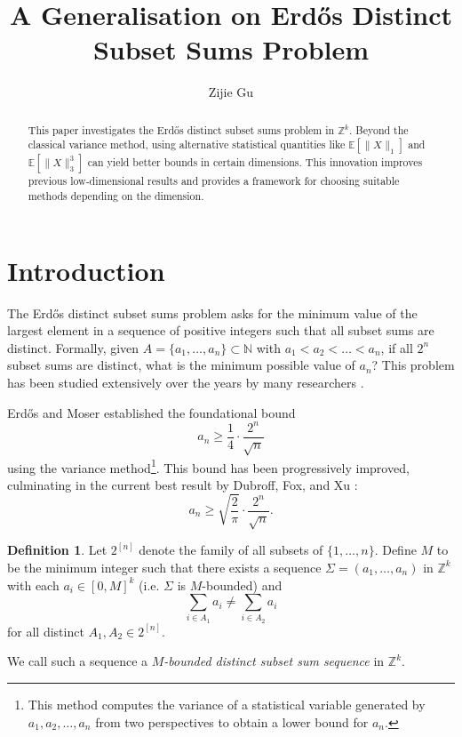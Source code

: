 \documentclass[11pt]{amsart}
\title{A Generalisation on Erd\H{o}s Distinct Subset Sums Problem}
\author{Zijie Gu}
\theoremstyle{plain}
\theoremstyle{definition}
\newtheorem{definition}[theorem]{Definition}
\numberwithin{equation}{section}
\begin{document}
\maketitle

\begin{abstract}
This paper investigates the Erd\H{o}s distinct subset sums problem in $\mathbb{Z}^k$. Beyond the classical variance method, using alternative statistical quantities like $\mathbb{E}[\|X\|_1]$ and $\mathbb{E}[\|X\|_3^3]$ can yield better bounds in certain dimensions. This innovation improves previous low-dimensional results and provides a framework for choosing suitable methods depending on the dimension. 
\end{abstract}

\section{Introduction}

The Erd\H{o}s distinct subset sums problem asks for the minimum value of the largest element in a sequence of positive integers such that all subset sums are distinct. Formally, given $A = \{a_1, \ldots, a_n\} \subset \mathbb{N}$ with $a_1 < a_2 < \ldots < a_n$, if all $2^n$ subset sums are distinct, what is the minimum possible value of $a_n$? This problem has been studied extensively over the years by many researchers \cite{aliev2008siegel, alon2016probabilistic, bae1996subset, elkies1986improved, erdos1941problems, guy1982sets,   steinerberger2023some,dubroff2021note}.



Erd\H{o}s and Moser \cite{erdos1941problems} established the foundational bound
\[
a_n \geq \frac{1}{4} \cdot \frac{2^n}{\sqrt{n}}
\]
using the variance method\footnote{This method computes the variance of a statistical variable generated by $a_1,a_2,\ldots,a_n$ from two perspectives to obtain a lower bound for $a_n$.}. This bound has been progressively improved, culminating in the current best result by Dubroff, Fox, and Xu \cite{dubroff2021note}:
\[
a_n \geq \sqrt{\frac{2}{\pi}} \cdot \frac{2^n}{\sqrt{n}}.
\]


\begin{definition}
    Let $2^{[n]}$ denote the family of all subsets of $\{1,\ldots,n\}$. Define $M$ to be the minimum integer such that there exists a sequence $\Sigma = (a_1,\ldots,a_n)$ in $\mathbb{Z}^k$ with each $a_i \in [0,M]^k$ (i.e. $\Sigma$ is $M$-bounded) and
    \[
    \sum_{i \in A_1} a_i \neq \sum_{i \in A_2} a_i
    \]
    for all distinct $A_1, A_2 \in 2^{[n]}$. 
    
    We call such a sequence a \emph{$M$-bounded distinct subset sum sequence} in $\mathbb{Z}^k$.
\end{definition}
\end{document}

